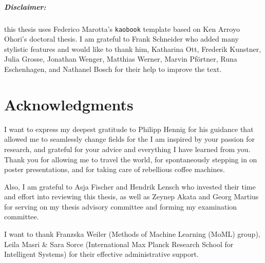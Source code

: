 {
  \thispagestyle{empty}
  \raggedright\null\vfill
  \paragraph{Disclaimer:} this thesis uses Federico Marotta's \texttt{kaobook}
  template based on Ken Arroyo Ohori's doctoral thesis. I am grateful to Frank
  Schneider who added many stylistic features and would like to thank him,
  Katharina Ott, Frederik Kunstner, Julia Grosse, Jonathan Wenger, Matthias
  Werner, Marvin Pf\"ortner, Runa Eschenhagen, and Nathanel Bosch for their help
  to improve the text.
}
\cleardoublepage


\chapter{Acknowledgments}


I want to express my deepest gratitude to Philipp Hennig for his guidance that
allowed me to seamlessly change fields for the \PhD I am inspired by your
passion for research, and grateful for your advice and everything I have learned
from you. Thank you for allowing me to travel the world, for spontaneously
stepping in on poster presentations, and for taking care of rebellious coffee
machines.

Also, I am grateful to Asja Fischer and Hendrik Lensch who invested their time
and effort into reviewing this thesis, as well as Zeynep Akata and Georg Martius
for serving on my thesis advisory committee and forming my examination
committee.

I want to thank
Franz{\tikzexternaldisable\TikzLowercaseSlightlySmilingFaceI{}}ska Weiler
(Methods of Machine Learning (MoML) group), Leila Masri \& Sara Sorce
(International Max Planck Research School for Intelligent Systems) for their
effective administrative support.


